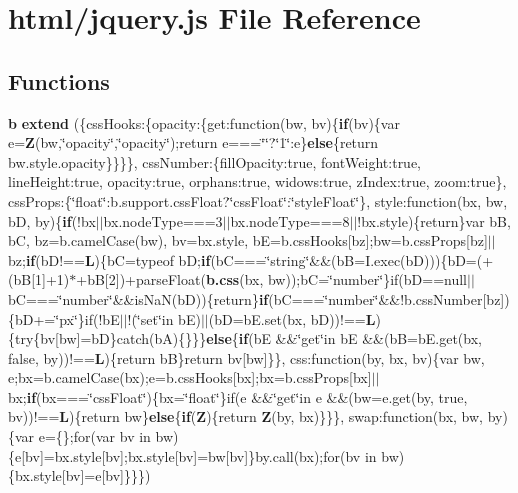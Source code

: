 \section{html/jquery.js File Reference}
\label{jquery_8js}
\subsection*{Functions}
\begin{DoxyCompactItemize}
\item 
{\bf b} {\bf extend} (\{css\-Hooks\-:\{opacity\-:\{get\-:function(bw, bv)\{{\bf if}(bv)\{var e={\bf Z}(bw,\char`\"{}opacity\char`\"{},\char`\"{}opacity\char`\"{});return e===\char`\"{}\char`\"{}?\char`\"{}1\char`\"{}\-:e\}{\bf else}\{return bw.\-style.\-opacity\}\}\}\}, css\-Number\-:\{fill\-Opacity\-:true, font\-Weight\-:true, line\-Height\-:true, opacity\-:true, orphans\-:true, widows\-:true, z\-Index\-:true, zoom\-:true\}, css\-Props\-:\{\char`\"{}float\char`\"{}\-:b.\-support.\-css\-Float?\char`\"{}css\-Float\char`\"{}\-:\char`\"{}style\-Float\char`\"{}\}, style\-:function(bx, bw, b\-D, by)\{{\bf if}(!bx$\vert$$\vert$bx.\-node\-Type===3$\vert$$\vert$bx.\-node\-Type===8$\vert$$\vert$!bx.\-style)\{return\}var b\-B, b\-C, bz=b.\-camel\-Case(bw), bv=bx.\-style, b\-E=b.\-css\-Hooks[bz];bw=b.\-css\-Props[bz]$\vert$$\vert$bz;{\bf if}(b\-D!=={\bf L})\{b\-C=typeof b\-D;{\bf if}(b\-C===\char`\"{}string\char`\"{}\&\&(b\-B=I.\-exec(b\-D)))\{b\-D=(+(b\-B[1]+1)$\ast$+b\-B[2])+parse\-Float({\bf b.\-css}(bx, bw));b\-C=\char`\"{}number\char`\"{}\}if(b\-D==null$\vert$$\vert$b\-C===\char`\"{}number\char`\"{}\&\&is\-Na\-N(b\-D))\{return\}{\bf if}(b\-C===\char`\"{}number\char`\"{}\&\&!b.\-css\-Number[bz])\{b\-D+=\char`\"{}px\char`\"{}\}if(!b\-E$\vert$$\vert$!(\char`\"{}set\char`\"{}in b\-E)$\vert$$\vert$(b\-D=b\-E.\-set(bx, b\-D))!=={\bf L})\{try\{bv[bw]=b\-D\}catch(b\-A)\{\}\}\}{\bf else}\{{\bf if}(b\-E \&\&\char`\"{}get\char`\"{}in b\-E \&\&(b\-B=b\-E.\-get(bx, false, by))!=={\bf L})\{return b\-B\}return bv[bw]\}\}, css\-:function(by, bx, bv)\{var bw, e;bx=b.\-camel\-Case(bx);e=b.\-css\-Hooks[bx];bx=b.\-css\-Props[bx]$\vert$$\vert$bx;{\bf if}(bx===\char`\"{}css\-Float\char`\"{})\{bx=\char`\"{}float\char`\"{}\}if(e \&\&\char`\"{}get\char`\"{}in e \&\&(bw=e.\-get(by, true, bv))!=={\bf L})\{return bw\}{\bf else}\{{\bf if}({\bf Z})\{return {\bf Z}(by, bx)\}\}\}, swap\-:function(bx, bw, by)\{var e=\{\};for(var bv in bw)\{e[bv]=bx.\-style[bv];bx.\-style[bv]=bw[bv]\}by.\-call(bx);for(bv in bw)\{bx.\-style[bv]=e[bv]\}\}\})
\item 

\end{DoxyCompactItemize}
